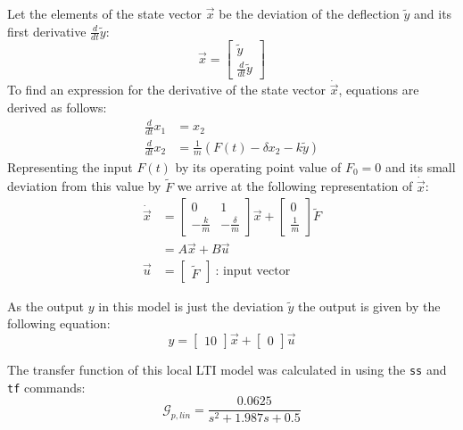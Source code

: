 Let the elements of the state vector $\vec{x}$ be the deviation of the deflection $\tilde{y}$ and its first derivative $\frac{d}{dt}\tilde{y}$:
\begin{equation}\label{eq:2:state vector}
	\vec{x} = \begin{bmatrix}
		\tilde{y}\\\frac{d}{dt}\tilde{y}
	\end{bmatrix}
\end{equation}
To find an expression for the derivative of the state vector $\dot{\vec{x}}$, equations are derived as follows:
\begin{align*}
	\frac{d}{dt} x_1 &= x_2\\
	\frac{d}{dt}x_2 &=\frac{1}{m}\left(F(t)-\delta x_2 - k\tilde{y}\right)
\end{align*}
Representing the input $F(t)$ by its operating point value of $F_0=0$ and its small deviation from this value by $\tilde{F}$ we arrive at the following representation of $\dot{\vec{x}}$:
\begin{align}
	\label{eq:2:x dot}
	\dot{\vec{x}} &=\begin{bmatrix}
		0&1\\-\frac{k}{m}&-\frac{\delta}{m}
	\end{bmatrix}\vec{x}
+\begin{bmatrix}
	0\\\frac{1}{m}
\end{bmatrix}\tilde{F}\\
&=A\vec{x} + B \vec{u}\nonumber\\
\vec{u}&=\begin{bmatrix}
	\tilde{F}
\end{bmatrix}\:\text{: input vector}\nonumber
\end{align}

As the output $y$ in this model is just the deviation $\tilde{y}$ the output is given by the following equation:
$$
y=\begin{bmatrix}1 0\end{bmatrix}\vec{x} + \begin{bmatrix}0\end{bmatrix}\vec{u}
$$

The transfer function of this local LTI model was calculated in \matlab using the \texttt{ss} and \texttt{tf} commands:
\begin{equation}\label{eq:2:Gp lin}
	\mathcal{G}_{p,lin} = 
\frac{0.0625}{s^2 + 1.987 s + 0.5}
\end{equation}

